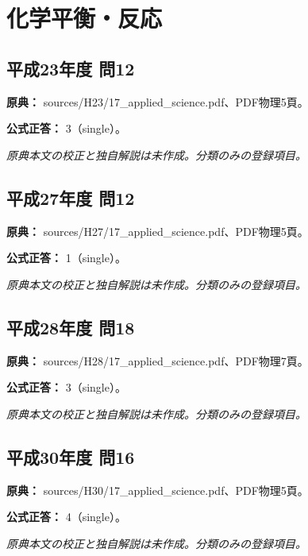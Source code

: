 \section{化学平衡・反応}

\subsection{平成23年度 問12}
\label{q:h23-reg-applied-12}

\noindent\textbf{原典：} sources/H23/17\_applied\_science.pdf、PDF物理5頁。

\textbf{公式正答：} 3（single）。

\par\textit{原典本文の校正と独自解説は未作成。分類のみの登録項目。}

\subsection{平成27年度 問12}
\label{q:h27-reg-applied-12}

\noindent\textbf{原典：} sources/H27/17\_applied\_science.pdf、PDF物理5頁。

\textbf{公式正答：} 1（single）。

\par\textit{原典本文の校正と独自解説は未作成。分類のみの登録項目。}

\subsection{平成28年度 問18}
\label{q:h28-reg-applied-18}

\noindent\textbf{原典：} sources/H28/17\_applied\_science.pdf、PDF物理7頁。

\textbf{公式正答：} 3（single）。

\par\textit{原典本文の校正と独自解説は未作成。分類のみの登録項目。}

\subsection{平成30年度 問16}
\label{q:h30-reg-applied-16}

\noindent\textbf{原典：} sources/H30/17\_applied\_science.pdf、PDF物理5頁。

\textbf{公式正答：} 4（single）。

\par\textit{原典本文の校正と独自解説は未作成。分類のみの登録項目。}

